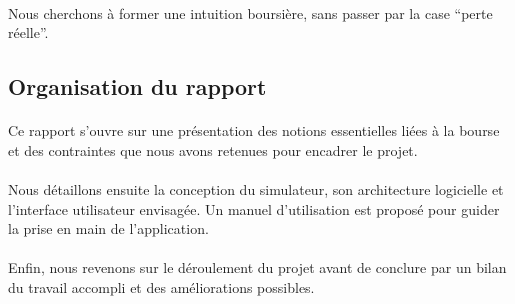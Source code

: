 \paragraph{}Nous cherchons à former une intuition boursière, sans passer par la case “perte réelle”.

\subsection{Organisation du rapport}

\paragraph{} Ce rapport s’ouvre sur une présentation des notions essentielles liées à la bourse et des contraintes que nous avons retenues pour encadrer le projet.
\paragraph{}Nous détaillons ensuite la conception du simulateur, son architecture logicielle et l’interface utilisateur envisagée.
Un manuel d’utilisation est proposé pour guider la prise en main de l’application.
\paragraph{}Enfin, nous revenons sur le déroulement du projet avant de conclure par un bilan du travail accompli et des améliorations possibles.